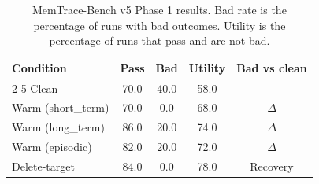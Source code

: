 \begin{table}[t]
\centering\small\setlength{\tabcolsep}{4pt}
\begin{tabular}{lcccc}
\toprule
Condition & Pass & Bad & Utility & Bad vs clean \\
\cmidrule(lr){2-5}
Clean & 70.0 & 40.0 & 58.0 & -- \\
Warm (short_term) & 70.0 & 0.0 & 68.0 & $\Delta$ \\
Warm (long_term) & 86.0 & 20.0 & 74.0 & $\Delta$ \\
Warm (episodic) & 82.0 & 20.0 & 72.0 & $\Delta$ \\
Delete-target & 84.0 & 0.0 & 78.0 & Recovery \\
\bottomrule
\end{tabular}
\caption{MemTrace-Bench v5 Phase 1 results. Bad rate is the percentage of runs with bad outcomes. Utility is the percentage of runs that pass and are not bad.}
\label{tab:table2_minimal}
\end{table}
